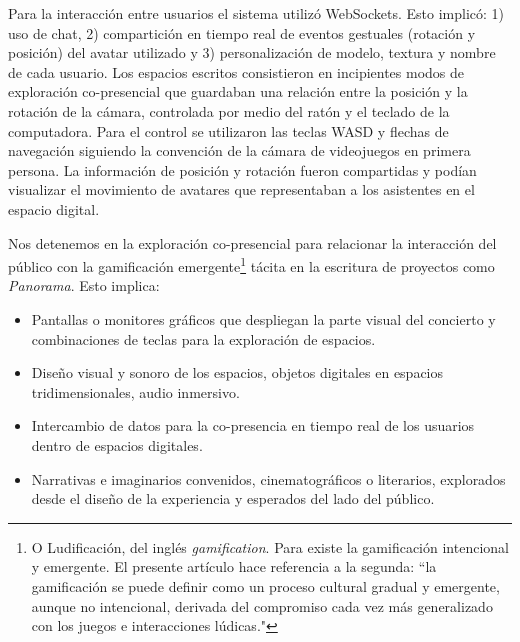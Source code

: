 
Para la interacción entre usuarios el sistema utilizó WebSockets. Esto implicó: 1) uso de chat, 2) compartición en tiempo real de eventos gestuales (rotación y posición) del avatar utilizado y 3) personalización de modelo, textura y nombre de cada usuario. Los espacios escritos consistieron en incipientes modos de exploración co-presencial que guardaban una relación entre la posición y la rotación de la cámara, controlada por medio del ratón y el teclado de la computadora. Para el control se utilizaron las teclas WASD y flechas de navegación siguiendo la convención de la cámara de videojuegos en primera persona. La información de posición y rotación fueron compartidas y podían visualizar el movimiento de avatares que representaban a los asistentes en el espacio digital. 

Nos detenemos en la exploración co-presencial para relacionar la interacción del público con la gamificación emergente\footnote{O Ludificación, del inglés \textit{gamification}. Para \cite{gamificacion} existe la gamificación intencional y emergente. El presente artículo hace referencia a la segunda: ``la gamificación se puede definir como un proceso cultural gradual y emergente, aunque no intencional, derivada del compromiso cada vez más generalizado con los juegos e interacciones lúdicas."} tácita en la escritura de proyectos como \textit{Panorama}. Esto implica:

\begin{itemize}
\item Pantallas o monitores gráficos que despliegan la parte visual del concierto y combinaciones de teclas para la exploración de espacios.
\item Diseño visual y sonoro de los espacios, objetos digitales en espacios tridimensionales, audio inmersivo.
\item Intercambio de datos para la co-presencia en tiempo real de los usuarios dentro de espacios digitales.
\item Narrativas e imaginarios convenidos, cinematográficos o literarios, explorados desde el diseño de la experiencia y esperados del lado del público. 
\end{itemize}

